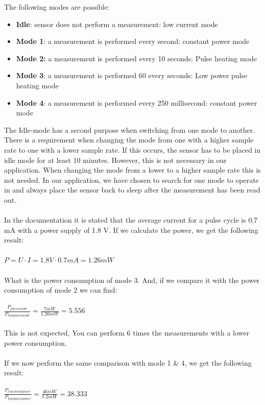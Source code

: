 \documentclass[11pt,a4paper]{article}
\begin{document}
The following modes \cite{bib:CCS811} are possible:
\begin{itemize}
	\item \textbf{Idle}: sensor does not perform a measurement: low current mode
	\item \textbf{Mode 1}: a measurement is performed every second: constant power mode
	\item \textbf{Mode 2:}  a measurement is performed every 10 seconds: Pulse heating mode
	\item \textbf{Mode 3}:  a measurement is performed 60 every seconds: Low power pulse heating mode
	\item \textbf{Mode 4}: a measurement is performed every 250 millisecond: constant power mode
\end{itemize}
The Idle-mode has a second purpose when switching from one mode to another. There is a requirement when changing the mode from one with a higher sample rate to one with a lower sample rate. If this occurs, the sensor has to be placed in idle mode for at least 10 minutes. However, this is not necessary in our application. When changing the mode from a lower to a higher sample rate this is not needed. In our application, we have chosen to search for one mode to operate in and always place the sensor back to sleep after the measurement has been read out.
\\ \\
In the documentation \cite{bib:CCS811} it is stated that the average current for a pulse cycle is 0.7 mA with a power supply of 1.8 V. If we calculate the power, we get the following result:
\\ \\
$P= U \cdot I=1.8 V \cdot 0.7 mA = 1.26 mW$
\\ \\
What is the power consumption of mode 3. And, if we compare it with the power consumption of mode 2 we can find:
\\ \\
$\frac{P_{pulse mode}}{P_{low pulse mode}}= \frac{7 mW}{1.26 mW}= 5.556$
\\ \\
This is not expected, You can perform 6 times the measurements with a lower power consumption.
\\ \\
If we now perform the same comparison with mode 1 \& 4, we get the following result:
\\ \\
$\frac{P_{constant power}} {P_{low pulse power}}= \frac{46mW}{1.2 mW}= 38.333$
\end{document}
